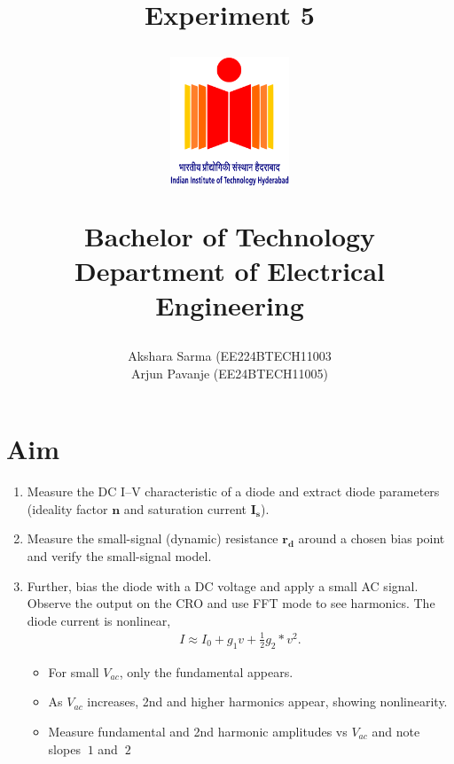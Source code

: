\documentclass[12pt,a4paper]{report}
\begin{document}
\title{\textbf{Experiment 5}\\
\LARGE{\textbf{ }}
\author{Akshara Sarma (EE224BTECH11003 \\ Arjun Pavanje (EE24BTECH11005)}

\begin{center}
\end{center}
\vspace{30pt}
\begin{figure}[ht]
	\centering
	\includegraphics[width = 100pt]{logo.png}\\
\end{figure}
\begin{center}
	Bachelor of Technology\\
	\vspace{10pt}
	Department of Electrical Engineering\\
\end{center}
}
\maketitle
\section{Aim}
\begin{enumerate}
\item Measure the DC I–V characteristic of a diode and extract diode parameters (ideality factor $\mathbf{n}$ and saturation current $\mathbf{I_s}$). 
\item Measure the small-signal (dynamic) resistance $\mathbf{r_d}$ around a chosen bias point and verify the small-signal model. 
\item Further, bias the diode with a DC voltage and apply a small AC signal. Observe the output on the CRO and use FFT mode to see harmonics. The diode current is nonlinear,
\begin{align*}
I \approx I_0 + g_1v + \frac{1}{2}g_2*v^2.
\end{align*}
\begin{itemize}
\item For small $V_{ac}$, only the fundamental appears. 
\item As $V_{ac}$ increases, 2nd and higher harmonics appear, showing nonlinearity. 
\item Measure fundamental and 2nd harmonic amplitudes vs $V_{ac}$ and note slopes $~1$ and $~2$
\end{itemize}
\end{enumerate}
\end{document}
